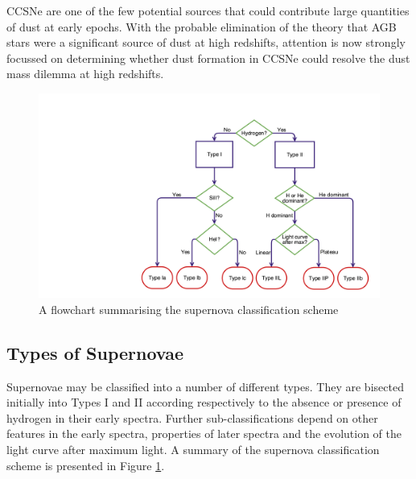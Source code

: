 CCSNe are one of the few potential sources that could contribute large quantities of dust at early epochs.  With the probable elimination of the theory that AGB stars were a significant source of dust at high redshifts, attention is now strongly focussed on determining whether dust formation in CCSNe could resolve the dust mass dilemma  at high redshifts.

\begin{figure}
\centering
\includegraphics[clip=true, scale = 0.2, trim= 930 50 55 210]{chapters/chapter1/figs/sn_classification.png}
\caption{A flowchart summarising the supernova classification scheme}
\label{intro:fig:sn_class}
\end{figure}

\subsection{Types of Supernovae}

Supernovae may be classified into a number of different types.  They are bisected initially into Types I and II according respectively to the absence or presence of hydrogen in their early spectra.  Further sub-classifications depend on  other features in the early spectra, properties of later spectra and the evolution of the  light curve after maximum light.  A summary of the supernova classification scheme is presented in Figure \ref{intro:fig:sn_class}.  


